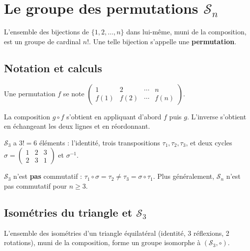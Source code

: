 \section{Le groupe des permutations $\mathcal{S}_n$}

\begin{propbox}
L'ensemble des bijections de $\{1, 2, \ldots, n\}$ dans lui-même, muni de la composition, est un groupe de cardinal $n!$. Une telle bijection s'appelle une \textbf{permutation}.
\end{propbox}

\subsection{Notation et calculs}

Une permutation $f$ se note $\begin{pmatrix} 1 & 2 & \cdots & n \\ f(1) & f(2) & \cdots & f(n) \end{pmatrix}$.

La composition $g \circ f$ s'obtient en appliquant d'abord $f$ puis $g$. L'inverse s'obtient en échangeant les deux lignes et en réordonnant.

\begin{exbox}
$\mathcal{S}_3$ a $3! = 6$ éléments : l'identité, trois transpositions $\tau_1, \tau_2, \tau_3$, et deux cycles $\sigma = \begin{pmatrix} 1 & 2 & 3 \\ 2 & 3 & 1 \end{pmatrix}$ et $\sigma^{-1}$.

$\mathcal{S}_3$ n'est \textbf{pas} commutatif : $\tau_1 \circ \sigma = \tau_2 \neq \tau_3 = \sigma \circ \tau_1$. Plus généralement, $\mathcal{S}_n$ n'est pas commutatif pour $n \geqslant 3$.
\end{exbox}

\subsection{Isométries du triangle et $\mathcal{S}_3$}

\begin{propbox}
L'ensemble des isométries d'un triangle équilatéral (identité, 3 réflexions, 2 rotations), muni de la composition, forme un groupe isomorphe à $(\mathcal{S}_3, \circ)$.
\end{propbox}

